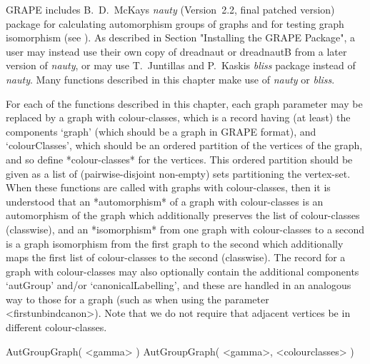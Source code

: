 %
%
%
%
\def\GRAPE{\sf GRAPE}
\def\nauty{\it nauty}
\def\bliss{\it bliss}
\def\G{\Gamma}
\def\Aut{{\rm Aut}\,}
\def\x{\times}

{\GRAPE} includes B.~D.~McKay{\pif}s {\nauty} (Version~2.2, final patched
version) package for calculating automorphism groups of graphs and for
testing graph isomorphism (see \cite{Nau90,MP14}).  As described in
Section "Installing the GRAPE Package", a user may instead use their own
copy of dreadnaut or dreadnautB from a later version of {\nauty}, or may
use T.~Juntilla{\pif}s and P.~Kaski{\pif}s {\bliss} package \cite{JK07}
instead of {\nauty}. Many functions described in this chapter make use
of {\nauty} or {\bliss}.


For each of the functions described in this chapter, each graph parameter
may be replaced by a graph with colour-classes, which is a record having
(at least) the components `graph' (which should be a graph in {\GRAPE}
format), and `colourClasses', which should be an ordered partition of the
vertices of the graph, and so define *colour-classes* for the vertices.
This ordered partition should be given as a list of (pairwise-disjoint
non-empty) sets partitioning the vertex-set.  When these functions are
called with graphs with colour-classes, then it is understood that an
*automorphism* of a graph with colour-classes is an automorphism of the
graph which additionally preserves the list of colour-classes (classwise),
and an *isomorphism* from one graph with colour-classes to a second is a
graph isomorphism from the first graph to the second which additionally
maps the first list of colour-classes to the second (classwise). The
record for a graph with colour-classes may also optionally contain the
additional components `autGroup' and/or `canonicalLabelling', and these
are handled in an analogous way to those for a graph (such as when using
the parameter <firstunbindcanon>).  Note that we do not require that
adjacent vertices be in different colour-classes.


\>AutGroupGraph( <gamma> )
\>AutGroupGraph( <gamma>, <colourclasses> )


